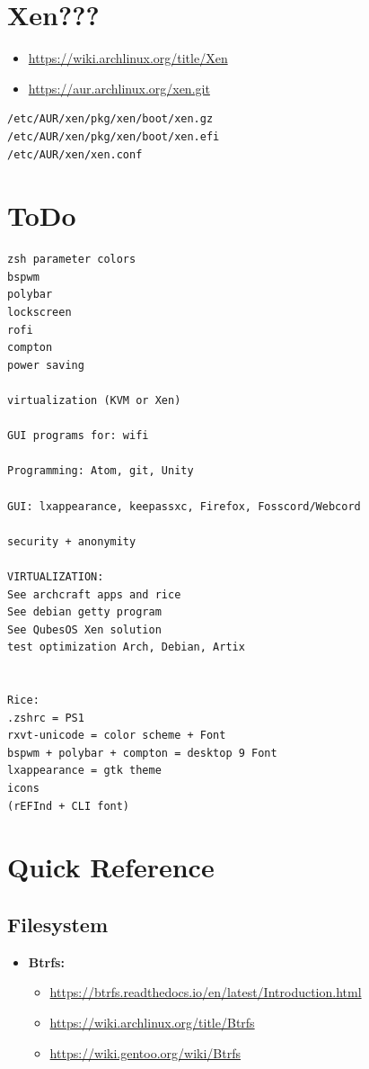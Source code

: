 \documentclass[10pt, a4paper, onecolumn, oneside, titlepage, openany]{book}
\begin{document}
\chapter{Xen???}
\begin{itemize}
    \item \url{https://wiki.archlinux.org/title/Xen}
    \item \url{https://aur.archlinux.org/xen.git}
\end{itemize}
\begin{Verbatim}[commandchars=\\\{\}]
/etc/AUR/xen/pkg/xen/boot/xen.gz
/etc/AUR/xen/pkg/xen/boot/xen.efi
/etc/AUR/xen/xen.conf
\end{Verbatim}        


\chapter{ToDo}
\begin{Verbatim}[commandchars=\\\{\}]
zsh parameter colors
bspwm
polybar
lockscreen
rofi
compton
power saving

virtualization (KVM or Xen)

GUI programs for: wifi

Programming: Atom, git, Unity

GUI: lxappearance, keepassxc, Firefox, Fosscord/Webcord

security + anonymity

VIRTUALIZATION:
See archcraft apps and rice
See debian getty program
See QubesOS Xen solution
test optimization Arch, Debian, Artix


Rice:
.zshrc = PS1
rxvt-unicode = color scheme + Font
bspwm + polybar + compton = desktop 9 Font
lxappearance = gtk theme
icons
(rEFInd + CLI font)
\end{Verbatim}



\chapter{Quick Reference}
\section{Filesystem}
\begin{itemize}
    \item \textbf{Btrfs:}
    \begin{itemize}
        \item \url{https://btrfs.readthedocs.io/en/latest/Introduction.html}
        \item \url{https://wiki.archlinux.org/title/Btrfs}
        \item \url{https://wiki.gentoo.org/wiki/Btrfs}
    \end{itemize}
\end{itemize}
\end{document}
